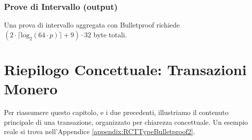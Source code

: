 \subsubsection*{Prove di Intervallo (output)}

Una prova di intervallo aggregata con Bulletproof richiede $(2 \cdot \lceil \textrm{log}_2(64 \cdot p) \rceil + 9) \cdot 32$ byte totali.



\newpage
\section{Riepilogo Concettuale: Transazioni Monero}
\label{sec:transaction_summary}

Per riassumere questo capitolo, e i due precedenti, illustriamo il contenuto principale di una transazione, organizzato per chiarezza concettuale. Un esempio reale si trova nell'Appendice \ref{appendix:RCTTypeBulletproof2}.

